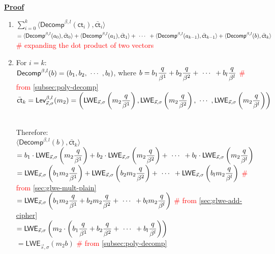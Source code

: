 \textbf{\underline{Proof}}
\begin{enumerate}
\item $\sum\limits_{i=0}^{k}\langle \textsf{Decomp}^{\beta, l}(\textsf{ct}_i), \bar{\textsf{ct}}_i \rangle$ \\
$= \langle \textsf{Decomp}^{\beta, l}(a_0), \bar{\textsf{ct}}_0 \rangle + \langle \textsf{Decomp}^{\beta, l}(a_1), \bar{\textsf{ct}}_1 \rangle + \text{ } \text{$\cdots$} \text{ } + \langle \textsf{Decomp}^{\beta, l}(a_{k-1}), \bar{\textsf{ct}}_{k-1} \rangle + \langle \textsf{Decomp}^{\beta, l}(b), \bar{\textsf{ct}}_k \rangle$ \\
\textcolor{red}{\# expanding the dot product of two vectors}
\item For $i = k$: \\
$\textsf{Decomp}^{\beta, l}(b) = (b_1, b_2, \text{ } \text{$\cdots$} \text{ }, b_l)$, where $b = b_1\dfrac{q}{\beta^1} + b_2\dfrac{q}{\beta^2} + \text{ } \text{$\cdots$} \text{ } + b_l\dfrac{q}{\beta^l}$ \textcolor{red}{\# from \autoref{subsec:poly-decomp}}\\
$\bar{\textsf{ct}}_k = \textsf{Lev}_{\vec{s}, \sigma}^{\beta, l}(m_2) = \left(\textsf{LWE}_{\vec{s}, \sigma}\left(m_{2}\dfrac{q}{\beta^1}\right), \textsf{LWE}_{\vec{s}, \sigma}\left(m_{2}\dfrac{q}{\beta^2}\right), \text{ } \text{$\cdots$} \text{ }, \textsf{LWE}_{\vec{s}, \sigma}\left(m_{2}\dfrac{q}{\beta^l}\right) \right)$ \\
$ $

Therefore: \\
$\langle \textsf{Decomp}^{\beta, l}(b), \bar{\textsf{ct}}_k \rangle$\\
$= b_1 \cdot \textsf{LWE}_{\vec{s}, \sigma} \left (m_{2}\dfrac{q}{\beta^1} \right ) + b_2 \cdot \textsf{LWE}_{\vec{s}, \sigma} \left (m_{2}\dfrac{q}{\beta^2} \right ) + \text{ } \text{$\cdots$} \text{ } + b_l \cdot \textsf{LWE}_{\vec{s}, \sigma} \left (m_{2}\dfrac{q}{\beta^l}\right)$ \\
$= \textsf{LWE}_{\vec{s}, \sigma} \left (b_1m_{2}\dfrac{q}{\beta^1} \right ) + \textsf{LWE}_{\vec{s}, \sigma} \left (b_2m_{2}\dfrac{q}{\beta^2} \right ) + \text{ } \text{$\cdots$} \text{ } + \textsf{LWE}_{\vec{s}, \sigma} \left (b_lm_{2}\dfrac{q}{\beta^l}\right)$ \textcolor{red}{\# from \autoref{sec:glwe-mult-plain}} \\
$= \textsf{LWE}_{\vec{s}, \sigma} \left (b_1m_{2}\dfrac{q}{\beta^1} + b_2m_{2}\dfrac{q}{\beta^2} + \text{ } \text{$\cdots$} \text{ } + b_lm_{2}\dfrac{q}{\beta^l}\right)$ \textcolor{red}{\# from \autoref{sec:glwe-add-cipher}}\\
$= \textsf{LWE}_{\vec{s}, \sigma} \left (m_{2} \cdot \left ( b_1\dfrac{q}{\beta^1} + b_2\dfrac{q}{\beta^2} + \text{ } \text{$\cdots$} \text{ } + b_l\dfrac{q}{\beta^l} \right)\right)$ \\
$= \textsf{LWE}_{\vec{s}, \sigma} (m_{2}b)$ \textcolor{red}{\# from \autoref{subsec:poly-decomp}}


\end{enumerate}
